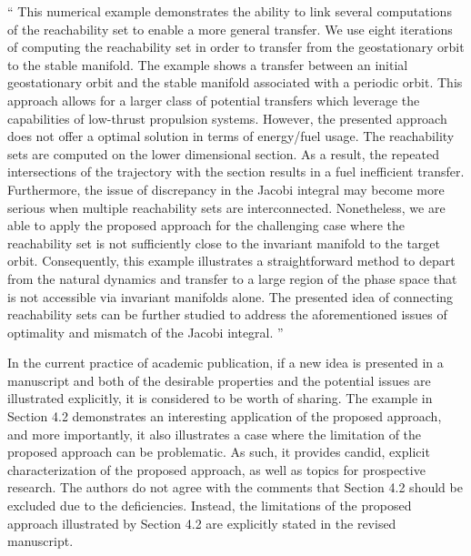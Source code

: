 \documentclass[11pt]{article}
\newenvironment{correction}{\begin{list}{}{\setlength{\leftmargin}{1cm}\setlength{\rightmargin}{1cm}}\vspace{\parsep}\item[]``}{''\end{list}}
\begin{document}
\begin{itemize}
        \begin{correction}
            This numerical example demonstrates the ability to link several computations of the reachability set to enable a more general transfer.
            We use eight iterations of computing the reachability set in order to transfer from the geostationary orbit to the stable manifold.
            The example shows a transfer between an initial geostationary orbit and the stable manifold associated with a periodic orbit. 
            This approach allows for a larger class of potential transfers which leverage the capabilities of low-thrust propulsion systems.
            However, the presented approach does not offer a optimal solution in terms of energy/fuel usage. 
            The reachability sets are computed on the lower dimensional \Poincare section.
            As a result, the repeated intersections of the trajectory with the \Poincare section results in a fuel inefficient transfer.
            Furthermore, the issue of discrepancy in the Jacobi integral may become more serious when multiple reachability sets are interconnected. 
            Nonetheless, we are able to apply the proposed approach for the challenging case where the reachability set is not sufficiently close to the invariant manifold to the target orbit. 
            Consequently, this example illustrates a straightforward method to depart from the natural dynamics and transfer to a large region of the phase space that is not accessible via invariant manifolds alone.
            The presented idea of connecting reachability sets can be further studied to address the aforementioned issues of optimality and mismatch of the Jacobi integral.
        \end{correction}

        In the current practice of academic publication, if a new idea is presented in a manuscript and both of the desirable properties and the potential issues are illustrated explicitly, it is considered to be worth of sharing. 
        The example in Section 4.2 demonstrates an interesting application of the proposed approach, and more importantly, it also illustrates a case where the limitation of the proposed approach can be problematic.
        As such, it provides candid, explicit characterization of the proposed approach, as well as topics for prospective research. 
        The authors do not agree with the comments that Section 4.2 should be excluded due to the deficiencies. 
        Instead, the limitations of the proposed approach illustrated by Section 4.2 are explicitly stated in the revised manuscript.


\end{itemize}
\end{document}
